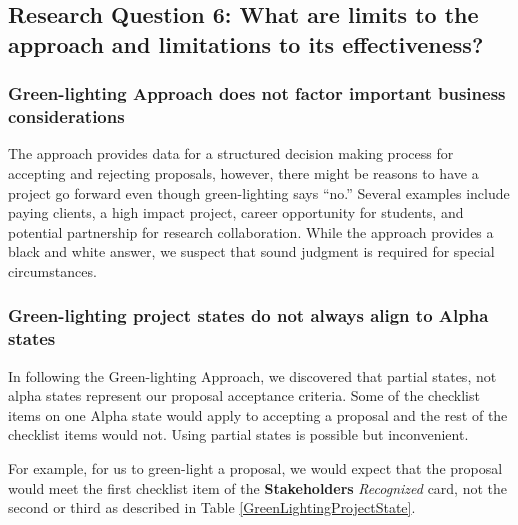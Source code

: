 \documentclass[conference]{IEEEtran}
\begin{document}

\subsection{Research Question 6: What are limits to
the approach and limitations to its effectiveness?}

\subsubsection{Green-lighting Approach does not factor important business considerations}
The approach provides data for a structured decision making process for
accepting and rejecting proposals, however, there might be reasons to
have a project go forward even though green-lighting says ``no.''
Several examples include paying clients, a high impact project, career
opportunity for students, and potential partnership for research
collaboration. While the approach provides a black and white answer,
we suspect that sound judgment is required for special circumstances.

\subsubsection{Green-lighting project states do not always
align to Alpha states}

In following the Green-lighting Approach, we discovered that partial
states, not alpha states represent our proposal acceptance criteria.
Some of the checklist items on one Alpha state would apply to accepting
a proposal and the rest of the checklist items would not. Using partial
states is possible but inconvenient. 

For example, for us to green-light a proposal, we would expect that the
proposal would meet the first checklist item of the
 \textbf{Stakeholders} \textit{Recognized} card, not the second or third as
described in Table \ref{GreenLightingProjectState}.
\end{document}

